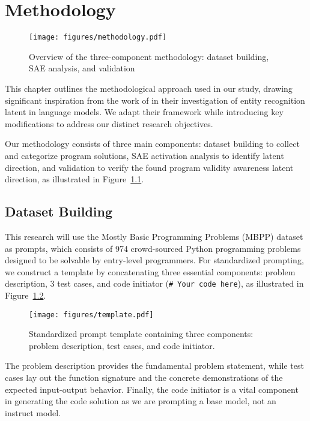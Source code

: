 \chapter{Methodology}
\label{sec:methodology}

\begin{figure}[!ht]
    \centering
    \texttt{[image: figures/methodology.pdf]}
    \caption{Overview of the three-component methodology: dataset building, SAE analysis, and validation}
    \label{fig:methodology}
\end{figure}

This chapter outlines the methodological approach used in our study, drawing significant inspiration from the work of  in their investigation of entity recognition latent in language models. We adapt their framework while introducing key modifications to address our distinct research objectives.

Our methodology consists of three main components: dataset building to collect and categorize program solutions, SAE activation analysis to identify latent direction, and validation to verify the found program validity awareness latent direction, as illustrated in Figure~\ref{fig:methodology}.

\section{Dataset Building}

This research will use the Mostly Basic Programming Problems (MBPP) dataset as prompts, which consists of 974 crowd-sourced Python programming problems designed to be solvable by entry-level programmers. For standardized prompting, we construct a template by concatenating three essential components:  problem description, 3 test cases, and code initiator (\texttt{\# Your code here}), as illustrated in Figure~\ref{fig:template}. 


\begin{figure}[!ht]
    \centering
    \texttt{[image: figures/template.pdf]}
    \caption{Standardized prompt template containing three components: problem description, test cases, and code initiator.}
    \label{fig:template}
\end{figure}

The problem description provides the fundamental problem statement, while test cases lay out the function signature and the concrete demonstrations of the expected input-output behavior. Finally, the code initiator is a vital component in generating the code solution as we are prompting a base model, not an instruct model.

